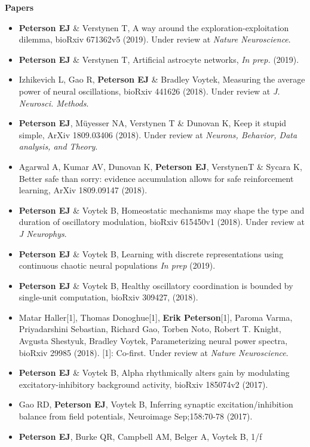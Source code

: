 \textbf{Papers}

\begin{itemize}
\item
  \textbf{Peterson EJ} \& Verstynen T, A way around the
  exploration-exploitation dilemma, bioRxiv 671362v5 (2019). Under
  review at \emph{Nature Neuroscience}.
\item
  \textbf{Peterson EJ} \& Verstynen T, Artificial astrocyte networks,
  \emph{In prep.} (2019).
\item
  Izhikevich L, Gao R, \textbf{Peterson EJ} \& Bradley Voytek, Measuring
  the average power of neural oscillations, bioRxiv 441626 (2018). Under
  review at \emph{J. Neurosci. Methods}.
\item
  \textbf{Peterson EJ}, Müyesser NA, Verstynen T \& Dunovan K, Keep it
  stupid simple, ArXiv 1809.03406 (2018). Under review at \emph{Neurons,
  Behavior, Data analysis, and Theory}.
\item
  Agarwal A, Kumar AV, Dunovan K, \textbf{Peterson EJ}, VerstynenT \&
  Sycara K, Better safe than sorry: evidence accumulation allows for
  safe reinforcement learning, ArXiv 1809.09147 (2018).
\item
  \textbf{Peterson EJ} \& Voytek B, Homeostatic mechanisms may shape the
  type and duration of oscillatory modulation, bioRxiv 615450v1 (2018).
  Under review at \emph{J Neurophys}.
\item
  \textbf{Peterson EJ} \& Voytek B, Learning with discrete
  representations using continuous chaotic neural populations \emph{In
  prep} (2019).
\item
  \textbf{Peterson EJ} \& Voytek B, Healthy oscillatory coordination is
  bounded by single-unit computation, bioRxiv 309427, (2018).
\item
  Matar Haller{[}1{]}, Thomas Donoghue{[}1{]}, \textbf{Erik
  Peterson}{[}1{]}, Paroma Varma, Priyadarshini Sebastian, Richard Gao,
  Torben Noto, Robert T. Knight, Avgusta Shestyuk, Bradley Voytek,
  Parameterizing neural power spectra, bioRxiv 29985 (2018). {[}1{]}:
  Co-first. Under review at \emph{Nature Neuroscience}.
\item
  \textbf{Peterson EJ} \& Voytek B, Alpha rhythmically alters gain by
  modulating excitatory-inhibitory background activity, bioRxiv 185074v2
  (2017).
\item
  Gao RD, \textbf{Peterson EJ}, Voytek B, Inferring synaptic
  excitation/inhibition balance from field potentials, Neuroimage
  Sep;158:70-78 (2017).
\item
  \textbf{Peterson EJ}, Burke QR, Campbell AM, Belger A, Voytek B, 1/f

\end{itemize}
